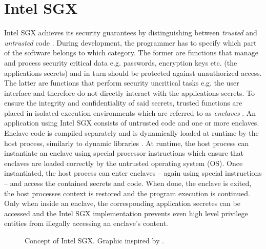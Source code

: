 \section{Intel SGX}
Intel SGX achieves its security guarantees by distinguishing between \textit{trusted} and \textit{untrusted} code \cite{IntelWebBasedTraining}. During development,
the programmer has to specify which part of the software belongs to which category. The former are functions that manage and process security critical data e.g. passwords,
encryption keys etc. (the applications secrets) and in turn should be protected against unauthorized access. The latter are functions that perform security uncritical 
tasks e.g. the user interface and therefore do not directly interact with the applications secrets. To ensure the integrity and confidentiality of said secrets, trusted 
functions are placed in isolated execution environments which are referred to as \textit{enclaves} \cite{UseOfIntelSGX}. An application using Intel SGX consists of untrusted 
code and one or more enclaves. Enclave code is compiled separately and is dynamically loaded at runtime by the host process, similarly to dynamic libraries \cite{Costan2016IntelSE}.
At runtime, the host process can instantiate an enclave using special processor instructions which ensure that enclaves are loaded correctly by the untrusted operating system
(OS). Once instantiated, the host process can enter enclaves -- again using special instructions -- and access the contained secrets and code. When done, the enclave is exited,
the host processes context is restored and the program execution is continued. Only when inside an enclave, the corresponding application secretes can be accessed and the
Intel SGX implementation prevents even high level privilege entities from illegally accessing an enclave's content.
\begin{figure}[h!]
    \centering
    \caption{Concept of Intel SGX. Graphic inspired by \cite{IntelSGXExplanation}.}
    \label{fig:enclaveCall}
\end{figure}




